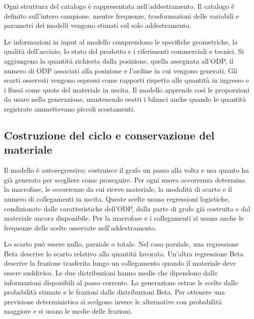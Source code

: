 Ogni struttura del catalogo è rappresentata nell'addestramento. Il catalogo è definito sull'intero campione, mentre frequenze, trasformazioni delle variabili e parametri dei modelli vengono stimati sul solo addestramento.

Le informazioni in input al modello comprendono le specifiche geometriche, la qualità dell'acciaio, lo stato del prodotto e i riferimenti commerciali e tecnici. Si aggiungono la quantità richiesta dalla posizione, quella assegnata all'ODP, il numero di ODP associati alla posizione e l'ordine in cui vengono generati. Gli scarti osservati vengono espressi come rapporti rispetto alle quantità in ingresso e i flussi come quote del materiale in uscita. Il modello apprende così le proporzioni da usare nella generazione, mantenendo esatti i bilanci anche quando le quantità registrate ammettevano piccoli scostamenti.

\subsection{Costruzione del ciclo e conservazione del materiale}
\label{sec:joint-graph-mass-generation}

Il modello è autoregressivo: costruisce il grafo un passo alla volta e usa quanto ha già generato per scegliere come proseguire. Per ogni nuova occorrenza determina la macrofase, le occorrenze da cui riceve materiale, la modalità di scarto e il numero di collegamenti in uscita. Queste scelte usano regressioni logistiche, condizionate dalle caratteristiche dell'ODP, dalla parte di grafo già costruita e dal materiale ancora disponibile. Per la macrofase e i collegamenti si usano anche le frequenze delle scelte osservate nell'addestramento.

Lo scarto può essere nullo, parziale o totale. Nel caso parziale, una regressione Beta descrive lo scarto relativo alla quantità lavorata. Un'altra regressione Beta descrive la frazione trasferita lungo un collegamento quando il materiale deve essere suddiviso. Le due distribuzioni hanno medie che dipendono dalle informazioni disponibili al passo corrente. La generazione estrae le scelte dalle probabilità stimate e le frazioni dalle distribuzioni Beta. Per ottenere una previsione deterministica si scelgono invece le alternative con probabilità maggiore e si usano le medie delle frazioni.

